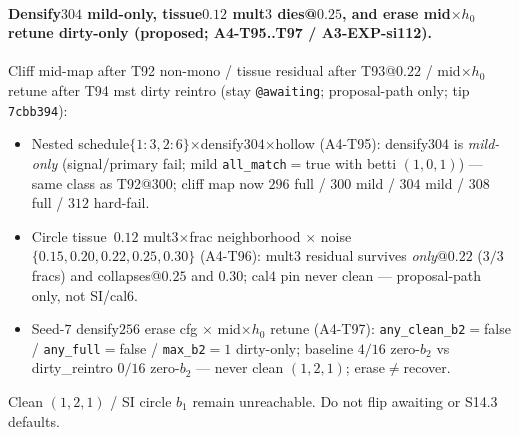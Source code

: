 \documentclass[11pt]{article}
\begin{document}
\paragraph{Densify$304$ mild-only, tissue$0.12$ mult$3$ dies@$0.25$, and
erase mid$\times h_0$ retune dirty-only (proposed; A4-T95..T97 /
A3-EXP-si112).}
Cliff mid-map after T92 non-mono / tissue residual after T93@$0.22$ /
mid$\times h_0$ retune after T94 mst dirty reintro (stay
\texttt{@awaiting}; proposal-path only; tip \texttt{7cbb394}):
\begin{itemize}[leftmargin=1.5em]
  \item Nested schedule$\{1{:}3,2{:}6\}$$\times$densify$304$$\times$hollow
  (A4-T95): densify$304$ is \emph{mild-only} (signal/primary fail; mild
  \texttt{all\_match}${=}$true with betti $(1,0,1)$) --- same class as
  T92@$300$; cliff map now $296$ full / $300$ mild / $304$ mild /
  $308$ full / $312$ hard-fail.
  \item Circle tissue~$0.12$ mult$3$$\times$frac neighborhood $\times$
  noise$\{0.15,0.20,0.22,0.25,0.30\}$ (A4-T96): mult$3$ residual
  survives \emph{only}@$0.22$ ($3/3$ fracs) and collapses@$0.25$ and
  $0.30$; cal$4$ pin never clean --- proposal-path only, not SI/cal$6$.
  \item Seed-$7$ densify$256$ erase cfg $\times$ mid$\times h_0$ retune
  (A4-T97): \texttt{any\_clean\_b2}${=}$false / \texttt{any\_full}${=}$false /
  \texttt{max\_b2}${=}1$ dirty-only; baseline $4/16$ zero-$b_2$ vs
  dirty\_reintro $0/16$ zero-$b_2$ --- never clean $(1,2,1)$;
  erase$\neq$recover.
\end{itemize}
Clean $(1,2,1)$ / SI circle $b_1$ remain unreachable. Do not flip
awaiting or S14.3 defaults.
\end{document}
